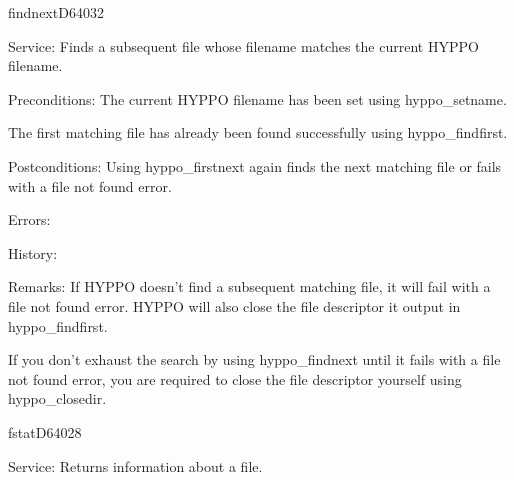 %
\newpage
\begin{hyppotrap}{findnext}{D640}{32}
\item [Service:]
  Finds a subsequent file whose filename matches the current HYPPO filename.
\item [Preconditions:]
  The current HYPPO filename has been set using hyppo\_setname.

  The first matching file has already been found successfully using
  hyppo\_findfirst.
\item [Postconditions:]
  Using hyppo\_firstnext again finds the next matching file or fails with a file
  not found error.
\item [Errors:]
\item [History:]
\item [Remarks:]
  If HYPPO doesn't find a subsequent matching file, it will fail with a
  file not found error. HYPPO will also close the file descriptor it
  output in hyppo\_findfirst.

  If you don't exhaust the search by using hyppo\_findnext until it fails with a
  file not found error, you are required to close the file descriptor yourself
  using hyppo\_closedir.
\end{hyppotrap}


\newpage
\begin{hyppotrap}{fstat}{D640}{28}
\item [Service:]
  Returns information about a file.
\notimplemented
\end{hyppotrap}


